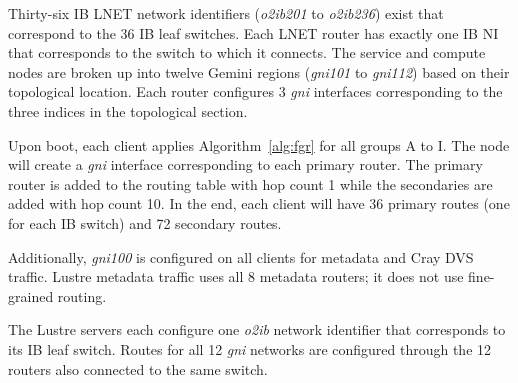 Thirty-six IB LNET network identifiers (\textit{o2ib201} to \textit{o2ib236})
exist that correspond to the 36 IB leaf switches. Each LNET router has exactly
one IB NI that corresponds to the switch to which it connects.  The service and
compute nodes are broken up into twelve Gemini regions (\textit{gni101} to
\textit{gni112}) based on their topological location.  Each router configures 3
\textit{gni} interfaces corresponding to the three indices in the topological
section.

Upon boot, each client applies Algorithm~\ref{alg:fgr} for all groups A to I.
The node will create a \textit{gni} interface corresponding to each primary
router.  The primary router is added to the routing table with hop count 1
while the secondaries are added with hop count 10.  In the end, each client
will have 36 primary routes (one for each IB switch) and 72 secondary routes.

Additionally, \textit{gni100} is configured on all clients for metadata and
Cray DVS traffic.  Lustre metadata traffic uses all 8 metadata routers; it does
not use fine-grained routing.

The Lustre servers each configure one \textit{o2ib} network identifier that
corresponds to its IB leaf switch.  Routes for all 12 \textit{gni} networks are
configured through the 12 routers also connected to the same switch.

